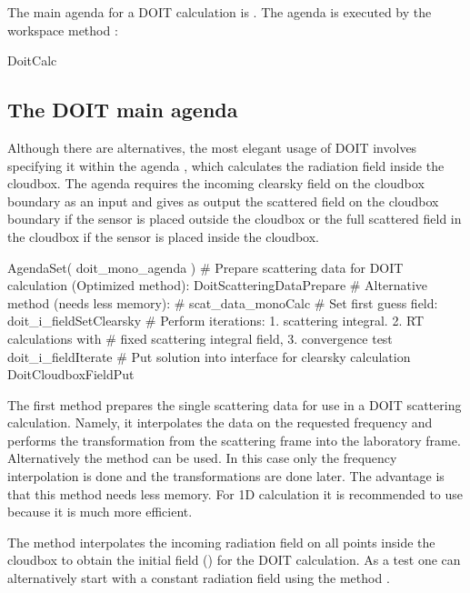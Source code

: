 The main agenda for a DOIT calculation is
. 
The agenda is executed by the workspace method
:
\begin{code}
DoitCalc
\end{code}

\subsection{The DOIT main agenda}
\label{sec:scattering:doit_main_agenda}

Although there are alternatives, the most elegant usage of DOIT involves
specifying it within the agenda , which calculates
the radiation field inside the cloudbox.
The agenda requires the incoming
clearsky field on the cloudbox boundary as an input and gives as
output the scattered field on the cloudbox boundary if the sensor is
placed outside the cloudbox or the full scattered field in the
cloudbox if the sensor is placed inside the cloudbox.
\begin{code}
AgendaSet( doit_mono_agenda ){
 # Prepare scattering data for DOIT calculation (Optimized method):
   DoitScatteringDataPrepare
 # Alternative method (needs less memory):
 # scat_data_monoCalc
 # Set first guess field:		
   doit_i_fieldSetClearsky
 # Perform iterations: 1. scattering integral. 2. RT calculations with 
 #   fixed scattering integral field, 3. convergence test 
   doit_i_fieldIterate
 # Put solution into interface for clearsky calculation   
   DoitCloudboxFieldPut
 }		
\end{code}
The first method  prepares the single
scattering data for use in a DOIT scattering calculation. Namely, it
interpolates the data on the requested
frequency and performs the transformation from the scattering
frame into the laboratory frame. Alternatively the method
 can be used. In this case only the
frequency interpolation is done and the transformations are done
later. The advantage is that this method needs less memory. For 1D
calculation it is recommended to use
 because it is much more
efficient. 

The method  interpolates the
incoming radiation field on all points inside the cloudbox to obtain
the initial field () for the DOIT calculation. 
As a test one can alternatively start with a constant radiation field
using the method . 

